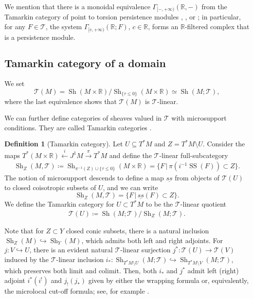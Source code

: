 \documentclass[11pt]{amsart}
\numberwithin{equation}{section}
\theoremstyle{plain}
\theoremstyle{definition}
\newtheorem{Def}[def]{Definition}
\theoremstyle{remark}
\newcommand{\bR} { {\mathbb{R}}}
\newcommand{\sT} { {\mathscr{T}}}
\newcommand{\Sh} { {\operatorname{Sh}}}
\newcommand\ms{\operatorname{SS}}
\begin{document}
We mention that there is a monoidal equivalence $\Gamma_{[-,+\infty)}(\bR, -)$ from the Tamarkin category of point to torsion persistence modules \cite[Lemma 4.9]{Hochschild-Kuo-Shende-Zhang}, \cite[Proposition 4.22]{Efimov-K-theory}, or \cite{APT-Tatsuki-Zhang}; in particular, for any $F \in \sT$, the system $\Gamma_{[c,+\infty)}(\bR; F)$, ${c\in\bR}$, forms an $\bR$-filtered complex that is a persistence module.

\subsection{Tamarkin category of a domain}\label{sec:tamarkin domain}
We set
\[\sT(M)= \Sh(M \times \bR)/\Sh_{\{\tau\leq 0\}}(M \times \bR)\simeq \Sh(M;\sT),\]
where the last equivalence shows that $\sT(M)$ is $\sT$-linear.

We can further define categories of sheaves valued in $\sT$ with microsupport conditions. They are called Tamarkin categories \cite{tamarkin2013,GS2014}.

\begin{Def}[Tamarkin category]
Let $U \subseteq T^*M$ and $Z = T^*M \setminus U$. Consider the maps $ T^*(M \times \bR) \xleftarrow{i} J^1 M \xrightarrow{\pi} T^*M$ and  define the $\sT$-linear full-subcategory
\begin{align}
  \Sh_Z(M,\sT)\coloneqq \Sh_{\pi^{-1}(Z) \cup \{\tau \leq 0\}}(M \times \bR) = \{F\, |\, 
\pi(i^{-1} {\ms}(F)) \subset Z\}.
\end{align}
The notion of microsupport descends to define
a map $\underline{ss}$ from objects of $\sT(U)$ to closed coisotropic subsets of $U$, and we can write
\[\Sh_Z(M,\sT) = \{F\, |\, \underline{ss}(F) \subset Z\}.\]
We define the Tamarkin category for $U \subset T^*M$ to be the $\sT$-linear quotient
\begin{align}
\sT(U) \coloneqq \Sh(M; \sT) /\Sh_Z(M;\sT).
\end{align}
\end{Def}

Note that for $Z \subset Y$ closed conic subsets, there is a natural inclusion $\Sh_Z(M) \hookrightarrow \Sh_Y(M)$, which admits both left and right adjoints. 
For
$j: V \hookrightarrow U$, there is an evident natural $\sT$-linear surjection 
$j^*: \sT(U) \to \sT(V)$
induced by the $\sT$-linear inclusion $i_*: \Sh_{T^*M \setminus U}(M; \sT) \hookrightarrow \Sh_{T^*M \setminus V}(M; \sT)$, which preserves both limit and colimit. 
Then, both $i_*$ and $j^*$ admit left (right) adjoint $i^*(i^!)$ and $j_!(j_*)$ given by either the wrapping formula or, equivalently, the microlocal cut-off formula; see, for example \cite{Hochschild-Kuo-Shende-Zhang,zhang-cutoff}.
\end{document}
